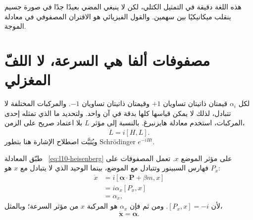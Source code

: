 هذه اللغة دقيقة في التمثيل الكتلي، لكن لا ينبغي المضي بعيدًا جدًا في صورة جسيم ينقلب ميكانيكيًا بين سهمين. والقول الفيزيائي هو الاقتران المصفوفي في معادلة الموجة.

\begin{classroomqa}
\end{classroomqa}

\begin{classroomqa}
\end{classroomqa}

\section{مصفوفات ألفا هي السرعة، لا اللفّ المغزلي}

لكل \(\alpha_i\) قيمتان ذاتيتان تساويان \(+1\) وقيمتان ذاتيتان تساويان \(-1\). والمركبات المختلفة لا تتبادل، لذلك لا يمكن قياسها كلها بدقة في آن واحد. ولتحديد ما الذي تمثله إحدى المركبات، استخدم معادلة هايزنبرغ. بالنسبة إلى مؤثر \(L\) بلا اعتماد صريح على الزمن،
\begin{equation}
\dot L=i[H,L].
\label{eq:l10-heisenberg}
\end{equation}
ويُثبَّت اصطلاح الإشارة هنا بتطور Schr\"odinger \(e^{-iHt}\).

طبّق المعادلة ~\eqref{eq:l10-heisenberg} على مؤثر الموضع \(x\). تعمل المصفوفات على فهارس السبينور وتتبادل مع الموضع، بينما الوحيد الذي لا يتبادل مع \(x\) هو \(P_x\):
\begin{align}
\dot x
&=i[\boldsymbol{\alpha}\cdot\mathbf P+\beta m,x]\\
&=i\alpha_x[P_x,x]\\
&=\alpha_x,
\label{eq:l10-velocity}
\end{align}
لأن \([P_x,x]=-i\). ومن ثم فإن \(\alpha_x\) هو المركبة \(x\) من مؤثر السرعة؛ وبالمثل،
\begin{equation}
\dot{\mathbf x}=\boldsymbol{\alpha}.
\end{equation}

